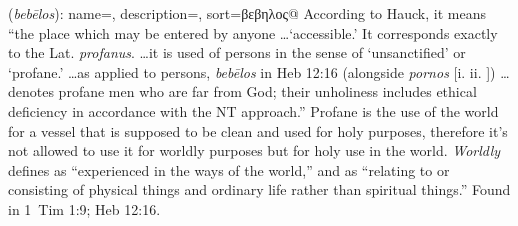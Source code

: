 \item[Profane,]

(\textit{bebēlos}):
{
    name=,
    description={},
    sort=βεβηλος@
}
According to Hauck, it means ``the place which may be entered by anyone \ldots `accessible.' It corresponds exactly to the Lat. \emph{profanus}. \ldots it is used of persons in the sense of `unsanctified' or `profane.' \ldots as applied to persons, \emph{bebēlos} in Heb 12:16 (alongside \emph{pornos} [i.  ii. ]) \ldots denotes profane men who are far from God; their unholiness includes ethical deficiency in accordance with the NT approach.''
Profane is the use of the world for a vessel that is supposed to be clean and used for holy purposes, therefore it's not allowed to use it for worldly purposes but for holy use in the world.
\emph{Worldly} defines as ``experienced in the ways of the world,'' and as ``relating to or consisting of physical things and ordinary life rather than spiritual things.''
Found in 1~Tim 1:9; Heb 12:16.
